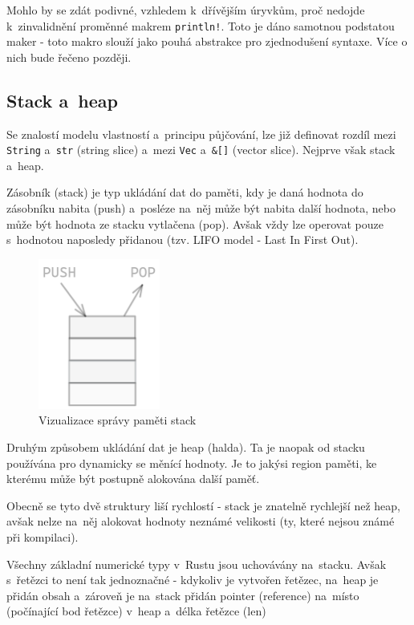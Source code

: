 \documentclass[a4paper, 12pt, twoside]{article} %
\newcommand{\rust}[1]{\texttt{#1}}
\begin{document}
			Mohlo by se zdát podivné, vzhledem k~dřívějším úryvkům, proč nedojde k~zinvalidnění proměnné makrem \rust{println!}. Toto je dáno samotnou podstatou maker - toto makro slouží jako pouhá abstrakce pro zjednodušení syntaxe. Více o nich bude řečeno později.
			
		\subsection{Stack a~heap}
			Se znalostí modelu vlastností a~principu půjčování, lze již definovat rozdíl mezi \rust{String} a~\rust{str} (string slice) a~mezi \rust{Vec} a~\rust{&[]} (vector slice). Nejprve však stack a~heap.
				
			Zásobník (stack) je typ ukládání dat do paměti, kdy je daná hodnota do zásobníku nabita (push) a~posléze na~něj může být nabita další hodnota, nebo může být hodnota ze stacku vytlačena (pop). Avšak vždy lze operovat pouze s~hodnotou naposledy přidanou (tzv. LIFO model - Last In First Out).
			\begin{center}
				\begin{figure}[H]
					\centering
					\includegraphics[width=4cm]{stack}
					\caption{Vizualizace správy paměti stack}
					\label{fig:my_label_2}
				\end{figure}
			\end{center}
				
			Druhým způsobem ukládání dat je heap (halda). Ta je naopak od stacku používána pro dynamicky se měnící hodnoty. Je to jakýsi region paměti, ke kterému může být postupně alokována další paměť.
				
			Obecně se tyto dvě struktury liší rychlostí - stack je znatelně rychlejší než heap, avšak nelze na~něj alokovat hodnoty neznámé velikosti (ty, které nejsou známé při kompilaci).
				
			Všechny základní numerické typy v~Rustu jsou uchovávány na~stacku. Avšak s~řetězci to není tak jednoznačné - kdykoliv je vytvořen řetězec, na~heap je přidán obsah a~zároveň je na~stack přidán pointer (reference) na~místo (počínající bod řetězce) v~heap a~délka řetězce (len)
				
\end{document}
